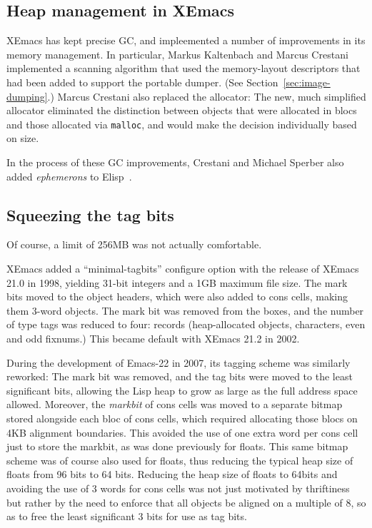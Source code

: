 \documentclass[format=acmsmall, review=false, screen=true]{acmart}
\newcommand \Elisp {Elisp}
\begin{document}
\subsection{Heap management in XEmacs}
\label{sec:heap-xemacs}

XEmacs has kept precise GC, and impleemented a number of improvements
in its memory management.  In particular, Markus Kaltenbach and Marcus
Crestani implemented a scanning algorithm that used the memory-layout
descriptors that had been added to support the portable dumper.  (See
Section~\ref{sec:image-dumping}.)  Marcus Crestani also replaced the
allocator: The new, much simplified allocator eliminated the
distinction between objects that were allocated in blocs and those
allocated via \texttt{malloc}, and would make the decision
individually based on size.

In the process of these GC improvements, Crestani and Michael Sperber
also added \emph{ephemerons} to \Elisp{}~\cite{Hayes1997}.

\subsection{Squeezing the tag bits}
\label{sec:tag-bits}

Of course, a limit of 256MB was not actually comfortable.

XEmacs added a ``minimal-tagbits'' configure option with the release
of XEmacs 21.0 in 1998, yielding 31-bit integers and a 1GB maximum
file size.  The mark bits moved to the object headers, which were also
added to cons cells, making them 3-word objects.
The mark bit was removed from the boxes, and the number of
type tags was reduced to four: records (heap-allocated objects,
characters, even and odd fixnums.)  This became default with XEmacs
21.2 in 2002.

During the development of Emacs-22 in 2007, its tagging scheme was
similarly reworked: The mark bit was removed, and the tag bits were
moved to the least significant bits, allowing the Lisp heap to grow as
large as the full address space allowed.
Moreover, the \emph{markbit} of cons cells was moved to a separate bitmap
stored alongside each bloc of cons cells, which required allocating those
blocs on 4KB alignment boundaries.  This avoided the use of one extra word
per cons cell just to store the markbit, as was done previously for floats.
This same bitmap scheme
was of course also used for floats, thus reducing the typical heap size of
floats from 96 bits to 64 bits.  Reducing the heap size of floats to 64bits
and avoiding the use of 3 words for cons cells was not just motivated by
thriftiness but rather by the need to enforce that all objects be aligned on
a multiple of 8, so as to free the least significant 3 bits for use as
tag bits.
\end{document}
